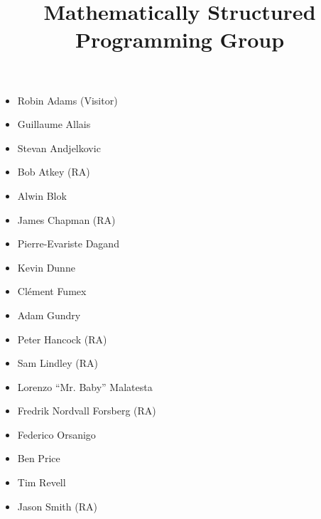 \documentclass{article}
\begin{document}
\title{\Huge \textbf{Mathematically Structured Programming Group}}

\date{}
\maketitle
\thispagestyle{empty} %

\begin{center}

%

\vskip -0.5cm
\large
\begin{itemize}
  \addtolength{\leftskip}{2cm}
  \item Robin Adams (Visitor)
  \item Guillaume Allais
  \item Stevan Andjelkovic
  \item Bob Atkey (RA)
  \item Alwin Blok
  \item James Chapman (RA)
  \item Pierre-Evariste Dagand
  \item Kevin Dunne
  \item Cl\'{e}ment Fumex
  \item Adam Gundry
  \item Peter Hancock (RA)
  \item Sam Lindley (RA)
  \item Lorenzo ``Mr. Baby'' Malatesta
  \item Fredrik Nordvall Forsberg (RA)
  \item Federico Orsanigo
  \item Ben Price
  \item Tim Revell
  \item Jason Smith (RA)
\end{itemize}
\vskip 1cm

\end{center}
\end{document}
